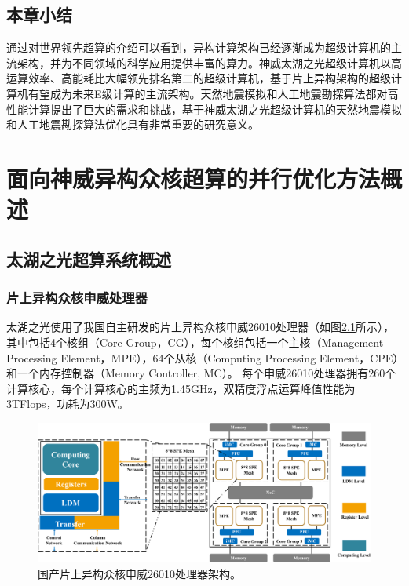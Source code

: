 \documentclass[degree=doctor]{thuthesis}
\begin{document}
\section{本章小结}

通过对世界领先超算的介绍可以看到，异构计算架构已经逐渐成为超级计算机的主流架构，并为不同领域的科学应用提供丰富的算力。神威太湖之光超级计算机以高运算效率、高能耗比大幅领先排名第二的超级计算机，基于片上异构架构的超级计算机有望成为未来E级计算的主流架构。天然地震模拟和人工地震勘探算法都对高性能计算提出了巨大的需求和挑战，基于神威太湖之光超级计算机的天然地震模拟和人工地震勘探算法优化具有非常重要的研究意义。

\chapter{面向神威异构众核超算的并行优化方法概述}

\section{太湖之光超算系统概述}
\subsection{片上异构众核申威处理器}


太湖之光使用了我国自主研发的片上异构众核申威26010处理器（如图\ref{fig:sunwaycpu}所示），其中包括4个核组（Core Group，CG）\citep {fu2016sunway}，每个核组包括一个主核（Management Processing Element，MPE），64个从核（Computing Processing Element，CPE）和一个内存控制器（Memory Controller, MC）。 每个申威26010处理器拥有260个计算核心，每个计算核心的主频为1.45GHz，双精度浮点运算峰值性能为3TFlops，功耗为300W。

\begin{figure}[ht]
\centering
\includegraphics[width=1\columnwidth,page=3]{SW26010架构-crop.pdf}
\caption{国产片上异构众核申威26010处理器架构。}
\label{fig:sunwaycpu}
\end{figure}
\end{document}
